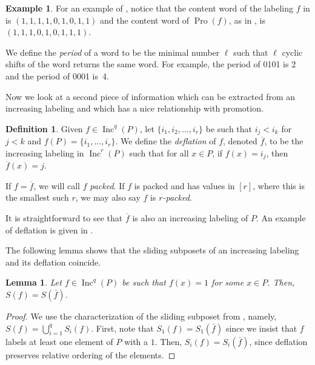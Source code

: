 \documentclass[11pt]{amsart}
\newtheorem{lemma}[theorem]{Lemma}
\theoremstyle{definition}
\newtheorem{definition}[theorem]{Definition}
\newtheorem{example}[theorem]{Example}
\DeclareMathOperator{\Inc}{\mathrm{Inc}}
\DeclareMathOperator{\Pro}{\mathrm{Pro}}
\begin{document}
\begin{example}\label{ex:ContentRotation}
For an example of , notice that the content word of the labeling $f$ in   is $(1,1,1,1,0,1,0,1,1)$ and the content word of $\Pro(f)$, as in , is $(1,1,1,0,1,0,1,1,1)$.
\end{example}

We define the \emph{period} of a word to be the minimal number $\ell$ such that $\ell$ cyclic shifts of the word returns the same word. For example, the period of 0101 is 2 and the period of 0001 is~4. 

Now we look at a second piece of information which can be extracted from an increasing labeling and which has a nice relationship with promotion.


\begin{definition}
\label{def:deflation} 
Given $f \in \Inc^q(P)$, let   $\{i_1, i_2, \ldots, i_r\}$ be such that $i_j < i_k$ for $j < k$ and $f(P) = \{i_1,\ldots,i_r\}$.  We define the \emph{deflation} of $f$, denoted $\overline{f}$, to be the increasing labeling in $\Inc^r(P)$ such that for all $x \in P$, if $f(x) = i_j$, then $\overline{f}(x) = j$.

If $f = \overline{f}$, we will call $f$ \emph{packed}. If $f$ is packed and has values in $[r]$, where this is the smallest such $r$, we may also say $f$ is \emph{$r$-packed}.
\end{definition}

It is straightforward to see that $\overline{f}$ is also an increasing labeling of $P$. An example of deflation is given in . 

The following lemma shows that the sliding subposets of an increasing labeling and its deflation coincide.
\begin{lemma}
\label{lem:sliding_deflation}
Let $f \in \Inc^q(P)$ be such that $f(x) = 1$ for some $x \in P$. Then, $S(f) = S(\bar{f})$.
\end{lemma}

\begin{proof}
We use the characterization of the sliding subposet from , namely, $S(f) = \bigcup_{i=1}^q S_i(f)$. First, note that $S_1(f) = S_1(\bar{f})$ since we insist that $f$ labels at least one element of $P$ with a $1$. Then, $S_i(f) = S_i(\bar{f})$, since deflation preserves relative ordering of the elements.    
\end{proof}
\end{document}
